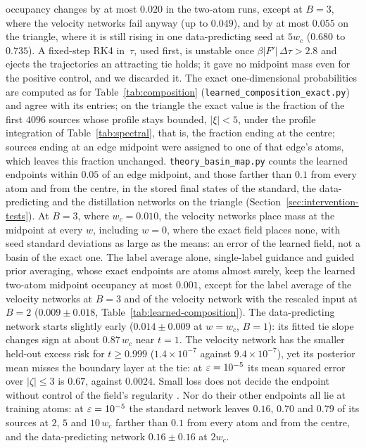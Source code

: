 \documentclass{article} %
\theoremstyle{plain}
\theoremstyle{definition}
\theoremstyle{remark}
\begin{document}
occupancy changes by at most $0.020$ in the two-atom runs, except at $B=3$, where the velocity
networks fail anyway (up to $0.049$), and by at most $0.055$ on the triangle, where it is still
rising in one data-predicting seed at $5w_c$ ($0.680$ to $0.735$). A fixed-step RK4
in~$\tau$, used first, is unstable once $\beta|F'|\,\Delta\tau>2.8$ and ejects the trajectories
an attracting tie holds; it gave no midpoint mass even for the positive control, and we discarded
it. The exact one-dimensional probabilities are computed as for Table~\ref{tab:composition}
(\texttt{learned\_composition\_exact.py}) and agree with its entries; on the
triangle the exact value is the fraction of the first $4096$ sources whose profile stays bounded,
$|\xi|<5$, under the profile integration of Table~\ref{tab:spectral}, that is, the fraction ending
at the centre; sources ending at an edge midpoint were assigned to one of that edge's atoms, which
leaves this fraction unchanged. \texttt{theory\_basin\_map.py} counts the learned endpoints within
$0.05$ of an edge midpoint, and those farther than $0.1$ from every atom and from the centre, in the
stored final states of the standard, the data-predicting and the distillation networks on the
triangle (Section~\ref{sec:intervention-tests}). At $B=3$, where $w_c=0.010$, the velocity networks place
mass at the midpoint at every $w$, including $w=0$, where the exact field places none, with seed
standard deviations as large as the means: an error of the learned field, not a basin of the
exact one. The label average alone, single-label guidance and guided prior averaging, whose
exact endpoints are atoms almost surely, keep the learned two-atom midpoint occupancy at most
$0.001$, except for the label average of the velocity networks at $B=3$ and of the velocity network
with the rescaled input at $B=2$ ($0.009\pm0.018$, Table~\ref{tab:learned-composition}). The data-predicting network starts slightly
early ($0.014\pm0.009$ at $w=w_c$, $B=1$): its fitted tie slope changes sign at about $0.87\,w_c$
near $t=1$. The velocity
network has the smaller held-out excess risk for $t\ge0.999$ ($1.4\times10^{-7}$ against
$9.4\times10^{-7}$), yet its posterior mean misses the boundary layer at the tie: at
$\varepsilon=10^{-5}$ its mean squared error over $|\zeta|\le3$ is $0.67$, against $0.0024$. Small loss does not
decide the endpoint without control of the field's regularity
\citep[Section~3, discussion of Assumption~3]{benton2024error}. Nor do their other endpoints all lie at training atoms: at
$\varepsilon=10^{-5}$ the standard network leaves $0.16$, $0.70$ and $0.79$ of its sources at $2$, $5$ and
$10\,w_c$ farther than $0.1$ from every atom and from the centre, and the data-predicting network
$0.16\pm0.16$ at $2w_c$.
\end{document}
